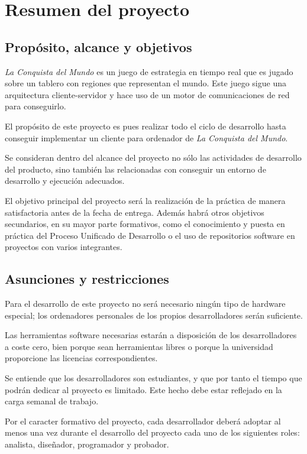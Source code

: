 \section{Resumen del proyecto}

\subsection{Propósito, alcance y objetivos}

\textit{La Conquista del Mundo} es un juego de estrategia en tiempo real que es
jugado sobre un tablero con regiones que representan el mundo. Este juego sigue
una arquitectura cliente-servidor y hace uso de un motor de comunicaciones de
red para conseguirlo.

El propósito de este proyecto es pues realizar todo el ciclo de desarrollo hasta
conseguir implementar un cliente para ordenador de \textit{La Conquista del
Mundo}.

Se consideran dentro del alcance del proyecto no sólo las actividades de
desarrollo del producto, sino también las relacionadas con conseguir un entorno
de desarrollo y ejecución adecuados.

El objetivo principal del proyecto será la realización de la práctica de manera
satisfactoria antes de la fecha de entrega. Además habrá otros objetivos
secundarios, en su mayor parte formativos, como el conocimiento y puesta en
práctica del Proceso Unificado de Desarrollo o el uso de repositorios software
en proyectos con varios integrantes.

\subsection{Asunciones y restricciones}

Para el desarrollo de este proyecto no será necesario ningún tipo de hardware
especial; los ordenadores personales de los propios desarrolladores serán
suficiente.

Las herramientas software necesarias estarán a disposición de los
desarrolladores a coste cero, bien porque sean herramientas libres o porque la
universidad proporcione las licencias correspondientes.

Se entiende que los desarrolladores son estudiantes, y que por tanto el tiempo
que podrán dedicar al proyecto es limitado. Este hecho debe estar reflejado en
la carga semanal de trabajo.

Por el caracter formativo del proyecto, cada desarrollador deberá adoptar al
menos una vez durante el desarrollo del proyecto cada uno de los siguientes
roles: analista, diseñador, programador y probador.

